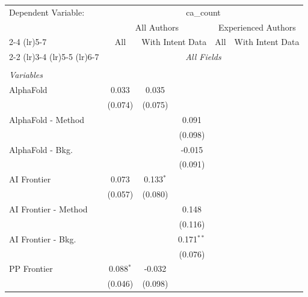\begingroup
\centering
\begin{tabular}{lcccccc}
   \tabularnewline \midrule \midrule
   Dependent Variable: & \multicolumn{6}{c}{ca\_count}\\
 & \multicolumn{3}{c}{All Authors} & \multicolumn{3}{c}{Experienced Authors} \\
\cmidrule(lr){2-4} \cmidrule(lr){5-7}
 & \multicolumn{1}{c}{All} & \multicolumn{2}{c}{With Intent Data} & \multicolumn{1}{c}{All} & \multicolumn{2}{c}{With Intent Data} \\
\cmidrule(lr){2-2} \cmidrule(lr){3-4} \cmidrule(lr){5-5} \cmidrule(lr){6-7}
 & \multicolumn{6}{c}{\textit{All Fields}} \\ \\
   \emph{Variables}\\
   AlphaFold            & 0.033       & 0.035       &              &        &        &   \\   
                        & (0.074)     & (0.075)     &              &        &        &   \\   
   AlphaFold - Method   &             &             & 0.091        &        &        &   \\   
                        &             &             & (0.098)      &        &        &   \\   
   AlphaFold - Bkg.     &             &             & -0.015       &        &        &   \\   
                        &             &             & (0.091)      &        &        &   \\   
   AI Frontier          & 0.073       & 0.133$^{*}$ &              &        &        &   \\   
                        & (0.057)     & (0.080)     &              &        &        &   \\   
   AI Frontier - Method &             &             & 0.148        &        &        &   \\   
                        &             &             & (0.116)      &        &        &   \\   
   AI Frontier - Bkg.   &             &             & 0.171$^{**}$ &        &        &   \\   
                        &             &             & (0.076)      &        &        &   \\   
   PP Frontier          & 0.088$^{*}$ & -0.032      &              &        &        &   \\   
                        & (0.046)     & (0.098)     &              &        &        &   \\   

\end{tabular}
